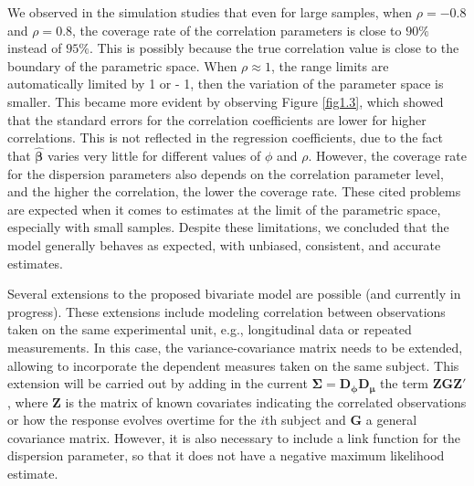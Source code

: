 \documentclass[useAMS,referee]{biom}
\begin{document}
We observed in the simulation studies that even for large samples, when $\rho = -0.8$ and $\rho = 0.8$,  the coverage rate of the correlation parameters is close to $90\%$ instead of $95\%$. This is possibly because the true correlation value is close to the boundary of the parametric space.
When  $\rho \approx 1$,  the range limits are automatically limited by 1 or - 1, then the variation of the parameter space is smaller. This became more evident by observing Figure \ref {fig1.3}, which showed that the standard errors for the correlation coefficients are lower for higher correlations.
This is not reflected in the regression coefficients, due to the fact that $\boldsymbol{\hat\beta}$ varies very little for different values of $\phi$ and $\rho$. However, the coverage rate for the dispersion parameters also depends on the correlation parameter level, and the higher the correlation, the lower the coverage rate.  These cited problems are expected when it comes to estimates at the limit of the parametric space, especially with small samples. Despite these limitations, we concluded that the model generally behaves as expected, with unbiased, consistent, and accurate estimates.


Several extensions to the proposed bivariate model are possible (and currently in progress). These extensions include modeling correlation between observations taken on the same experimental unit, e.g., longitudinal data or repeated measurements. In this case, the variance-covariance matrix needs to be extended, allowing to incorporate the dependent measures taken on the same subject.  This extension will be carried out by adding in the current $\boldsymbol{\Sigma} = \mathbf{D_\phi D_\mu}$ the term $\mathbf{ZGZ'}$, where $\mathbf{Z}$ is the matrix of known covariates indicating the correlated observations or how the response evolves overtime for the $i$th subject and $\mathbf{G}$ a general covariance matrix. However, it is also necessary to include a link function for the dispersion parameter, so that it does not have a negative maximum likelihood estimate. 

%
 
\end{document}
